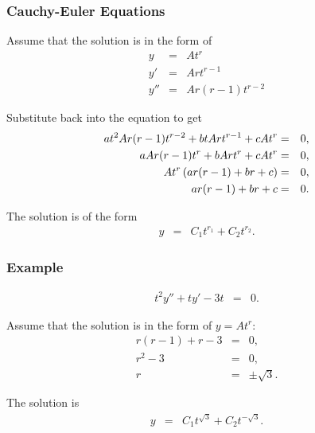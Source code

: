 \begin{frame}
  \frametitle{Cauchy-Euler Equations}

  Assume that the solution is in the form of
  \begin{eqnarray*}
    y & = & A t^r \\
    y' & = & A r t^{r-1} \\
    y'' & = & A r (r-1) t^{r-2}
  \end{eqnarray*}

  Substitute back into the equation to get
  \begin{eqnarray*}
    a t^2 A r (r-1) t^{r-2} + b t A r t^{r-1} + c A t^r & = & 0, \\
    a A r (r-1) t^{r} + b A r t^{r} + c A t^r & = & 0,  \\
    A t^r \left( a r (r-1) + br + c \right) & = & 0, \\
    a r (r-1) + br + c & = & 0.
  \end{eqnarray*}

  The solution is of the form
  \begin{eqnarray*}
    y & = & C_1 t^{r_1} + C_2 t^{r_2}.
  \end{eqnarray*}
  

\end{frame}


\begin{frame}
  \frametitle{Example}

  \begin{eqnarray*}
    t^2 y'' + t y' - 3t & = & 0.
  \end{eqnarray*}

  Assume that the solution is in the form of $y=At^r$:
  \begin{eqnarray*}
    r(r-1) + r - 3 & = & 0, \\
    r^2 - 3 & = & 0, \\
    r & = & \pm \sqrt{3}.
  \end{eqnarray*}

  The solution is 
  \begin{eqnarray*}
    y & = & C_1 t^{\sqrt{3}} + C_2 t^{-\sqrt{3}}.
  \end{eqnarray*}

\end{frame}


